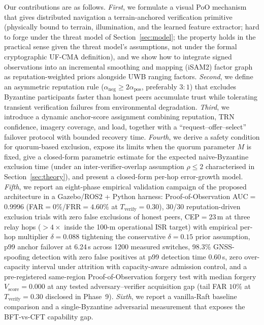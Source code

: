 \documentclass[journal,10pt,twocolumn]{IEEEtran}
\begin{document}
Our contributions are as follows. \emph{First}, we formulate a visual PoO mechanism that gives distributed navigation a terrain-anchored verification primitive (physically bound to terrain, illumination, and the learned feature extractor; hard to forge under the threat model of Section~\ref{sec:model}; the property holds in the practical sense given the threat model's assumptions, not under the formal cryptographic UF-CMA definition), and we show how to integrate signed observations into an incremental smoothing and mapping (iSAM2) factor graph as reputation-weighted priors alongside UWB ranging factors. \emph{Second}, we define an asymmetric reputation rule ($\alpha_\text{neg}\!\geq\!2\alpha_\text{pos}$, preferably $3{:}1$) that excludes Byzantine participants faster than honest peers accumulate trust while tolerating transient verification failures from environmental degradation. \emph{Third}, we introduce a dynamic anchor-score assignment combining reputation, TRN confidence, imagery coverage, and load, together with a ``request--offer--select'' failover protocol with bounded recovery time. \emph{Fourth}, we derive a safety condition for quorum-based exclusion, expose its limits when the quorum parameter $M$ is fixed, give a closed-form parametric estimate for the expected naive-Byzantine exclusion time (under an inter-verifier-overlap assumption $\rho\leq 2$ characterised in Section~\ref{sec:theory}), and present a closed-form per-hop error-growth model. \emph{Fifth}, we report an eight-phase empirical validation campaign of the proposed architecture in a Gazebo/ROS2 + Python harness: Proof-of-Observation AUC$=$0.9996 (FAR$=0\%$/FRR$=4.60\%$ at $T_\text{verify}=0.30$), 30/30 reputation-driven exclusion trials with zero false exclusions of honest peers, CEP$=$23\,m at three relay hops ($>\!4\times$ inside the 100-m operational ISR target) with empirical per-hop multiplier $\delta{=}0.088$ tightening the conservative $\delta=0.15$ prior assumption, p99 anchor failover at 6.24\,s across 1200 measured switches, 98.3\% GNSS-spoofing detection with zero false positives at p99 detection time 0.60\,s, zero over-capacity interval under attrition with capacity-aware admission control, and a pre-registered same-region Proof-of-Observation forgery test with median forgery $V_\text{score}=0.000$ at any tested adversary--verifier acquisition gap (tail FAR $10\%$ at $T_\text{verify}=0.30$ disclosed in Phase~9). \emph{Sixth}, we report a vanilla-Raft baseline comparison and a single-Byzantine adversarial measurement that exposes the BFT-vs-CFT capability gap.
\end{document}

